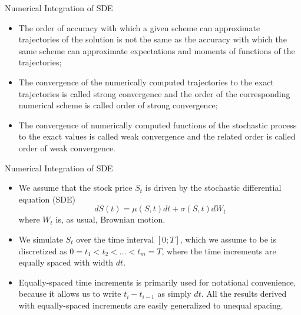 \documentclass[11pt]{beamer}
\begin{document}
\begin{frame}{Numerical Integration of SDE}
\begin{itemize}
\item The order of accuracy with which a given scheme can approximate trajectories of the solution is not the same as the accuracy with which the same scheme can approximate expectations and moments of functions of the trajectories;
\item The convergence of the numerically computed trajectories to the exact trajectories is called strong convergence and the order of the corresponding numerical scheme is called order of strong convergence;
\item The convergence of numerically computed functions of the stochastic process to the exact values is called weak convergence and the related order is called order of weak convergence.

\end{itemize}
\end{frame}
\begin{frame}{Numerical Integration of SDE}
\begin{itemize}
\item We assume that the stock price $S_t$ is driven by the stochastic differential
equation (SDE)
\begin{equation}\label{eq:num_int_sde_1}
dS(t) = \mu(S,t) dt + \sigma(S,t) dW_t
\end{equation}
where $W_t$ is, as usual, Brownian motion. 
\item We simulate $S_t$ over the time interval $[0; T]$,
which we assume to be is discretized as $0 = t_1 < t_2 < \dots < t_m = T$, where
the time increments are equally spaced with width $dt$.
\item Equally-spaced time
increments is primarily used for notational convenience, because it allows us
to write $t_i - t_{i-1}$ as simply $dt$. All the results derived with equally-spaced
increments are easily generalized to unequal spacing.
\end{itemize}
\end{frame}
\end{document}
